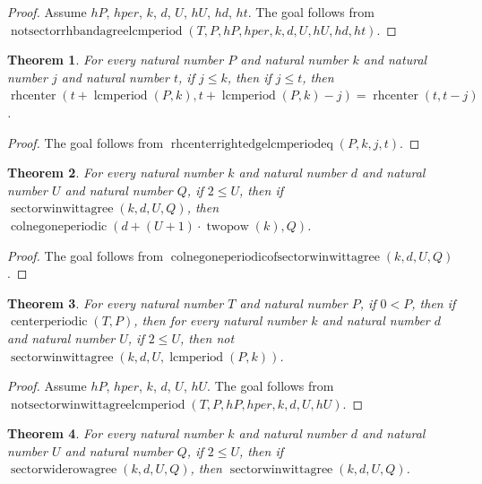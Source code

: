 \documentclass[11pt]{article}
\newtheorem{theorem}{Theorem}[section]
\theoremstyle{definition}
\begin{document}
\begin{proof}
Assume \(hP\), \(hper\), \(k\), \(d\), \(U\), \(hU\), \(hd\), \(ht\).
The goal follows from \(\operatorname{notsectorrhbandagreelcmperiod}(T, P, hP, hper, k, d, U, hU, hd, ht)\).
\end{proof}
\begin{theorem}
\label{ll:paper:rhcenter-right-edge-lcmperiod-eq}
For every natural number \(P\) and natural number \(k\) and natural number \(j\) and natural number \(t\), if \(j \le k\), then if \(j \le t\), then \(\operatorname{rhcenter}(t + \operatorname{lcmperiod}(P, k), t + \operatorname{lcmperiod}(P, k) - j) = \operatorname{rhcenter}(t, t - j)\).
\end{theorem}
\begin{proof}
The goal follows from \(\operatorname{rhcenterrightedgelcmperiodeq}(P, k, j, t)\).
\end{proof}
\begin{theorem}
\label{ll:paper:colnegoneperiodic-of-sector-winwittagree}
For every natural number \(k\) and natural number \(d\) and natural number \(U\) and natural number \(Q\), if \(2 \le U\), then if \(\operatorname{sectorwinwittagree}(k, d, U, Q)\), then \(\operatorname{colnegoneperiodic}(d + (U + 1) \cdot \operatorname{twopow}(k), Q)\).
\end{theorem}
\begin{proof}
The goal follows from \(\operatorname{colnegoneperiodicofsectorwinwittagree}(k, d, U, Q)\).
\end{proof}
\begin{theorem}
\label{ll:paper:not-sector-winwittagree-lcmperiod}
For every natural number \(T\) and natural number \(P\), if \(0 < P\), then if \(\operatorname{centerperiodic}(T, P)\), then for every natural number \(k\) and natural number \(d\) and natural number \(U\), if \(2 \le U\), then not \(\operatorname{sectorwinwittagree}(k, d, U, \operatorname{lcmperiod}(P, k))\).
\end{theorem}
\begin{proof}
Assume \(hP\), \(hper\), \(k\), \(d\), \(U\), \(hU\).
The goal follows from \(\operatorname{notsectorwinwittagreelcmperiod}(T, P, hP, hper, k, d, U, hU)\).
\end{proof}
\begin{theorem}
\label{ll:paper:sectorwinwittagree-of-sectorwiderowagree}
For every natural number \(k\) and natural number \(d\) and natural number \(U\) and natural number \(Q\), if \(2 \le U\), then if \(\operatorname{sectorwiderowagree}(k, d, U, Q)\), then \(\operatorname{sectorwinwittagree}(k, d, U, Q)\).
\end{theorem}
\end{document}
